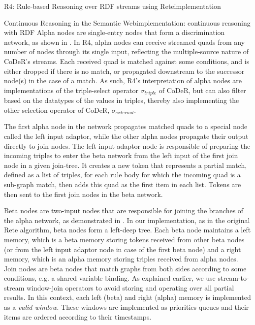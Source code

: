 \begin{nestedsection}{R4: Rule-based Reasoning over RDF streams using Rete}{implementation}
\begin{nestedsection}{Continuous Reasoning in the Semantic Web}{implementation: continuous reasoning with RDF}
		Alpha nodes are single-entry nodes that form a discrimination network, as shown in .
		In R4, alpha nodes can receive streamed quads from any number of nodes through its single input, reflecting the multiple-source nature of CoDeR's streams.
		Each received quad is matched against some conditions, and is either dropped if there is no match, or propagated downstream to the successor node(s) in the case of a match.
		As such, R4's interpretation of alpha nodes are implementations of the triple-select operator $\sigma_{triple}$ of CoDeR, but can also filter based on the datatypes of the values in triples, thereby also implementing the other selection operator of CoDeR, $\sigma_{external}$.

		The first alpha node in the network propagates matched quads to a special node called the left input adaptor, while the other alpha nodes propagate their output directly to join nodes.
		The left input adaptor node is responsible of preparing the incoming triples to enter the beta network from the left input of the first join node in a given join-tree.
		It creates a new token that represents a partial match, defined as a list of triples, for each rule body for which the incoming quad is a sub-graph match, then adds this quad as the first item in each list.
		Tokens are then sent to the first join nodes in the beta network.

		Beta nodes are two-input nodes that are responsible for joining the branches of the alpha network, as demonstrated in .
		In our implementation, as in the original Rete algorithm, beta nodes form a left-deep tree.
		Each beta node maintains a left memory, which is a beta memory storing tokens received from other beta nodes (or from the left input adaptor node in case of the first beta node) and a right memory, which is an alpha memory storing triples received from alpha nodes.
		Join nodes are beta nodes that match graphs from both sides according to some conditions, e.g. a shared variable binding.
		As explained earlier, we use stream-to-stream window-join operators to avoid storing and operating over all partial results.
		In this context, each left (beta) and right (alpha) memory is implemented as a \emph{valid window}.
		These windows are implemented as priorities queues and their items are ordered according to their timestamps.


\end{nestedsection}
\end{nestedsection}

